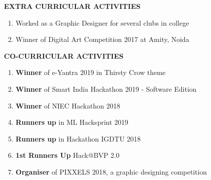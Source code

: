 \documentclass[10pt]{article}
\begin{document}
\vspace{5mm}
\begin{huge}
\textbf{\color{theme}EXTRA CURRICULAR ACTIVITIES}
\end{huge}
\begin{mdframed}[backgroundcolor=theme]
\end{mdframed}

\vspace{1mm}

\color{black}\normalsize{{
\begin{enumerate}
\item Worked as a Graphic Designer for several clubs in college\\
\item Winner of Digital Art Competition 2017 at Amity, Noida\\


\end{enumerate}
}}

\vspace{5mm}
\begin{huge}
\textbf{\color{theme}CO-CURRICULAR ACTIVITIES}
\end{huge}
\begin{mdframed}[backgroundcolor=theme]
\end{mdframed}

\vspace{1mm}

\color{black}\normalsize{{
\begin{enumerate}
\item \textbf{Winner} of e-Yantra 2019 in Thirsty Crow theme\\
\item \textbf{Winner} of Smart India Hackathon 2019 - Software Edition\\
\item \textbf{Winner} of NIEC Hackathon 2018\\
\item \textbf{Runners up} in ML Hacksprint 2019\\
\item \textbf{Runners up} in Hackathon IGDTU 2018\\
\item \textbf{1st Runners Up} Hack@BVP 2.0\\
\item \textbf{Organiser} of PIXXELS 2018, a graphic designing competition\\


\end{enumerate}
}}
\end{document}
